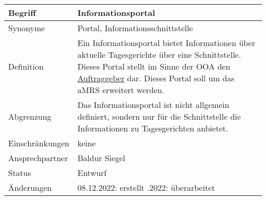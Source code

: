 \begin{table}[H]
    \centering
    \label{gls:informationsportal}
    \begin{tabularx}{\textwidth}{| l | X |}
        \hline
        Begriff         & Informationsportal                                                                                                                                                                                                                         \\
        \hline
        Synonyme        & Portal, Informationsschnittstelle                                                                                                                                                                                                          \\
        \hline
        Definition      & Ein Informationsportal bietet Informationen über aktuelle Tagesgerichte über eine Schnittstelle. Dieses Portal stellt im Sinne der OOA den \hyperref[gls:auftraggeber]{Auftraggeber} dar. Dieses Portal soll um das aMRS erweitert werden. \\
        \hline
        Abgrenzung      & Das Informationsportal ist nicht allgemein definiert, sondern nur für die Schnittstelle die Informationen zu Tagesgerichten anbietet.                                                                                                      \\
        \hline
        Einschränkungen & keine                                                                                                                                                                                                                                      \\
        \hline
        Ansprechpartner & Baldur Siegel                                                                                                                                                                                                                              \\
        \hline
        Status          & Entwurf                                                                                                                                                                                                                                    \\
        \hline
        Änderungen      & 08.12.2022: erstellt
        \newline 16.12.2022: überarbeitet                                                                                                                                                                                                                            \\
        \hline
    \end{tabularx}
\end{table}



